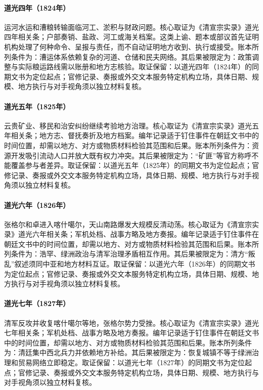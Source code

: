 \hypertarget{ledger:EQ-1824-GRAND-CANAL-CRISIS}{}\paragraph{道光四年（1824年）}运河水运和漕粮转输面临河工、淤积与财政问题。核心取证为《清宣宗实录》道光四年相关条；户部奏销、盐政、河工或海关档案。这类上谕、题本或部议首先证明机构处理了何种命令、呈报与责任，而不自动证明地方收到、执行或接受。账本所列条件为：漕运体系依赖复杂的河道、仓储和民夫网络。其后果被限定为：政策调整与实际粮运路线需以账册和地方志核验。取证保留：以道光四年（1824年）的同期文书为定位起点；官修记录、奏报或外交文本服务特定机构立场，具体日期、规模、地方执行与对手视角须以独立材料复核。
\hypertarget{ledger:EQ-1825-SOUTHWEST-MINING-UNREST}{}\paragraph{道光五年（1825年）}云贵矿业、移民和治安纠纷继续考验地方治理。核心取证为《清宣宗实录》道光五年相关条；地方志、督抚奏折及地方档案。编年记录适于钉住事件在朝廷文书中的时间位置，却需以地方、对方或物质材料检验其范围和后果。账本所列条件为：资源开发吸引流动人口并放大既有权力冲突。其后果被限定为：“矿匪”等官方称呼不能覆盖参与者差异。取证保留：以道光五年（1825年）的同期文书为定位起点；官修记录、奏报或外交文本服务特定机构立场，具体日期、规模、地方执行与对手视角须以独立材料复核。
\hypertarget{ledger:EQ-1826-JAHANGIR-KHOJA-UPRISING}{}\paragraph{道光六年（1826年）}张格尔和卓进入喀什噶尔，天山南路爆发大规模反清动荡。核心取证为《清宣宗实录》道光六年相关条；军机处档、战事方略及地方奏报。编年记录适于钉住事件在朝廷文书中的时间位置，却需以地方、对方或物质材料检验其范围和后果。账本所列条件为：浩罕、绿洲政治与清军治理矛盾相互作用。其后果被限定为：清方“叛乱”叙述须同中亚和地方材料互证。取证保留：以道光六年（1826年）的同期文书为定位起点；官修记录、奏报或外交文本服务特定机构立场，具体日期、规模、地方执行与对手视角须以独立材料复核。
\hypertarget{ledger:EQ-1827-KASHGAR-RECOVERY}{}\paragraph{道光七年（1827年）}清军反攻并收复喀什噶尔等地，张格尔势力受挫。核心取证为《清宣宗实录》道光七年相关条；军机处档、战事方略及地方奏报。编年记录适于钉住事件在朝廷文书中的时间位置，却需以地方、对方或物质材料检验其范围和后果。账本所列条件为：清廷集中西北兵力并依赖地方补给。其后果被限定为：恢复城镇不等于绿洲治理和贸易网络立即稳定。取证保留：以道光七年（1827年）的同期文书为定位起点；官修记录、奏报或外交文本服务特定机构立场，具体日期、规模、地方执行与对手视角须以独立材料复核。

